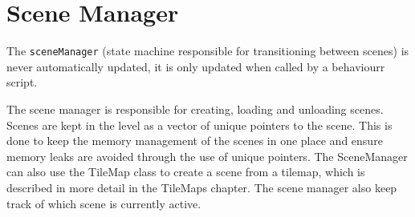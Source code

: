 \section{Scene Manager}
\label{sec:sceneManager}
The \texttt{sceneManager} (state machine responsible for transitioning between scenes) is never automatically updated, it is only updated when called by a behaviourr script.

\noindent The scene manager is responsible for creating, loading and unloading scenes.
Scenes are kept in the level as a vector of unique pointers to the scene.
This is done to keep the memory management of the scenes in one place and ensure memory leaks are avoided through the use of unique pointers.
The SceneManager can also use the TileMap class to create a scene from a tilemap, which is described in more detail in the TileMaps chapter.
The scene manager also keep track of which scene is currently active.